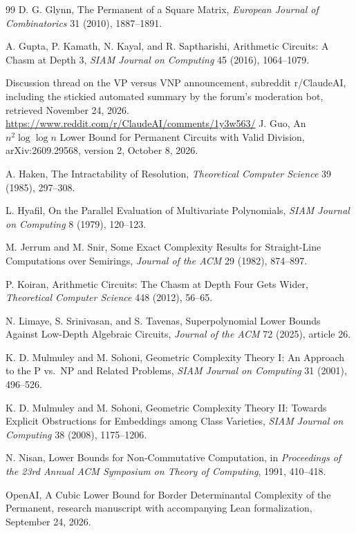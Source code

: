 \documentclass[11pt,letterpaper]{report}
\theoremstyle{plain}
\theoremstyle{definition}
\theoremstyle{remark}
\begin{document}
\begin{thebibliography}{99}
 D. G. Glynn, The Permanent of a Square Matrix, \emph{European Journal of Combinatorics} 31 (2010), 1887--1891.

 A. Gupta, P. Kamath, N. Kayal, and R. Saptharishi, Arithmetic Circuits: A Chasm at Depth 3, \emph{SIAM Journal on Computing} 45 (2016), 1064--1079.

 Discussion thread on the VP versus VNP announcement, subreddit r/ClaudeAI, including the stickied automated summary by the forum's moderation bot, retrieved November 24, 2026. \url{https://www.reddit.com/r/ClaudeAI/comments/1y3w563/}
 J. Guo, An $n^2\log\log n$ Lower Bound for Permanent Circuits with Valid Division, arXiv:2609.29568, version 2, October 8, 2026.

 A. Haken, The Intractability of Resolution, \emph{Theoretical Computer Science} 39 (1985), 297--308.

 L. Hyafil, On the Parallel Evaluation of Multivariate Polynomials, \emph{SIAM Journal on Computing} 8 (1979), 120--123.

 M. Jerrum and M. Snir, Some Exact Complexity Results for Straight-Line Computations over Semirings, \emph{Journal of the ACM} 29 (1982), 874--897.

 P. Koiran, Arithmetic Circuits: The Chasm at Depth Four Gets Wider, \emph{Theoretical Computer Science} 448 (2012), 56--65.

 N. Limaye, S. Srinivasan, and S. Tavenas, Superpolynomial Lower Bounds Against Low-Depth Algebraic Circuits, \emph{Journal of the ACM} 72 (2025), article 26.

 K. D. Mulmuley and M. Sohoni, Geometric Complexity Theory I: An Approach to the P vs.\ NP and Related Problems, \emph{SIAM Journal on Computing} 31 (2001), 496--526.

 K. D. Mulmuley and M. Sohoni, Geometric Complexity Theory II: Towards Explicit Obstructions for Embeddings among Class Varieties, \emph{SIAM Journal on Computing} 38 (2008), 1175--1206.

 N. Nisan, Lower Bounds for Non-Commutative Computation, in \emph{Proceedings of the 23rd Annual ACM Symposium on Theory of Computing}, 1991, 410--418.

 OpenAI, A Cubic Lower Bound for Border Determinantal Complexity of the Permanent, research manuscript with accompanying Lean formalization, September 24, 2026.


\end{thebibliography}
\end{document}
